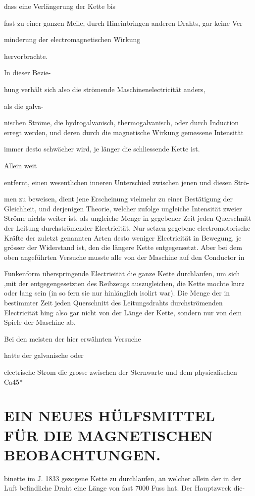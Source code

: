 \documentclass[12pt,a4paper]{article}
\begin{document}
dass eine Verlängerung der Kette bis

fast zu einer ganzen Meile, durch Hineinbringen anderen Drahts, gar keine Ver-

minderung der electromagnetischen Wirkung

hervorbrachte.

In dieser Bezie-

hung verhält sich also die strömende Maschinenelectricität anders,

als die galva-

nischen Ströme, die hydrogalvanisch, thermogalvanisch, oder durch Induction erregt werden, und deren durch die magnetische Wirkung gemessene Intensität

immer desto schwächer wird, je länger die schliessende Kette ist.

Allein weit

entfernt, einen wesentlichen inneren Unterschied zwischen jenen und diesen Strö-

men zu beweisen, dient jene Erscheinung vielmehr zu einer Bestätigung der Gleichheit, und derjenigen Theorie, welcher zufolge ungleiche Intensität zweier Ströme nichts weiter ist, als ungleiche Menge in gegebener Zeit jeden Querschnitt der Leitung durchströmender Electricität. Nur setzen gegebene electromotorische Kräfte der zuletzt genannten Arten desto weniger Electricität in Bewegung, je grösser der Widerstand ist, den die längere Kette entgegensetzt. Aber bei dem oben angeführten Versuche musste alle von der Maschine auf den Conductor in

Funkenform überspringende Electrieität die ganze Kette durchlaufen, um sich ‚mit der entgegengesetzten des Reibzeugs auszugleichen, die Kette mochte kurz oder lang sein (in so fern sie nur hinlänglich isolirt war). Die Menge der in bestimmter Zeit jeden Querschnitt des Leitungsdrahts durchströmenden Electricität hing also gar nicht von der Länge der Kette, sondern nur von dem Spiele der Maschine ab.

Bei den meisten der hier erwähnten Versuche

hatte der galvanische oder

electrische Strom die grosse zwischen der Sternwarte und dem physicalischen Ca45*

\section*{EIN NEUES HÜLFSMITTEL FÜR DIE MAGNETISCHEN BEOBACHTUNGEN.}
binette im J. 1833 gezogene Kette zu durchlaufen, an welcher allein der in der Luft befindliche Draht eine Länge von fast 7000 Fuss hat. Der Hauptzweck die-
\end{document}
